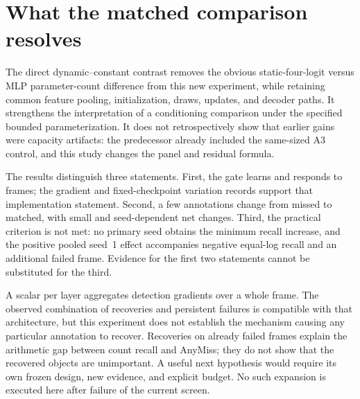 \section{What the matched comparison resolves}
The direct dynamic--constant contrast removes the obvious static-four-logit versus MLP parameter-count difference from this new experiment, while retaining common feature pooling, initialization, draws, updates, and decoder paths. It strengthens the interpretation of a conditioning comparison under the specified bounded parameterization. It does not retrospectively show that earlier gains were capacity artifacts: the predecessor already included the same-sized A3 control, and this study changes the panel and residual formula.

The results distinguish three statements. First, the gate learns and responds to frames; the gradient and fixed-checkpoint variation records support that implementation statement. Second, a few annotations change from missed to matched, with small and seed-dependent net changes. Third, the practical criterion is not met: no primary seed obtains the minimum recall increase, and the positive pooled seed~1 effect accompanies negative equal-log recall and an additional failed frame. Evidence for the first two statements cannot be substituted for the third.

A scalar per layer aggregates detection gradients over a whole frame. The observed combination of recoveries and persistent failures is compatible with that architecture, but this experiment does not establish the mechanism causing any particular annotation to recover. Recoveries on already failed frames explain the arithmetic gap between count recall and AnyMiss; they do not show that the recovered objects are unimportant. A useful next hypothesis would require its own frozen design, new evidence, and explicit budget. No such expansion is executed here after failure of the current screen.
